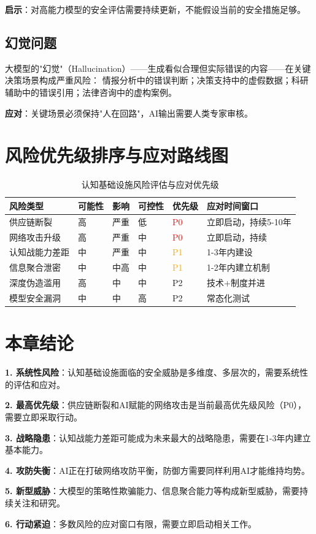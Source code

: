 \textbf{启示}：对高能力模型的安全评估需要持续更新，不能假设当前的安全措施足够。

\subsection{幻觉问题}

大模型的"幻觉"（Hallucination）——生成看似合理但实际错误的内容——在关键决策场景构成严重风险：
情报分析中的错误判断；决策支持中的虚假数据；科研辅助中的错误引用；法律咨询中的虚构案例。

\textbf{应对}：关键场景必须保持"人在回路"，AI输出需要人类专家审核。

\section{风险优先级排序与应对路线图}

\begin{table}[H]
\centering
\caption{认知基础设施风险评估与应对优先级}
\small
\begin{tabular}{p{2.5cm}p{1.2cm}p{1.2cm}p{1.2cm}p{1.5cm}p{3.5cm}}
\toprule
\textbf{风险类型} & \textbf{可能性} & \textbf{影响} & \textbf{可控性} & \textbf{优先级} & \textbf{应对时间窗口} \\
\midrule
供应链断裂 & 高 & 严重 & 低 & \textcolor{red}{P0} & 立即启动，持续5-10年 \\
网络攻击升级 & 高 & 严重 & 中 & \textcolor{red}{P0} & 立即启动，持续 \\
认知战能力差距 & 中 & 严重 & 中 & \textcolor{orange}{P1} & 1-3年内建设 \\
信息聚合泄密 & 中 & 中高 & 中 & \textcolor{orange}{P1} & 1-2年内建立机制 \\
深度伪造滥用 & 高 & 中 & 中 & P2 & 技术+制度并进 \\
模型安全漏洞 & 中 & 中 & 高 & P2 & 常态化测试 \\
\bottomrule
\end{tabular}
\end{table}

\section{本章结论}

\textbf{1. 系统性风险}：认知基础设施面临的安全威胁是多维度、多层次的，需要系统性的评估和应对。

\textbf{2. 最高优先级}：供应链断裂和AI赋能的网络攻击是当前最高优先级风险（P0），需要立即采取行动。

\textbf{3. 战略隐患}：认知战能力差距可能成为未来最大的战略隐患，需要在1-3年内建立基本能力。

\textbf{4. 攻防失衡}：AI正在打破网络攻防平衡，防御方需要同样利用AI才能维持均势。

\textbf{5. 新型威胁}：大模型的策略性欺骗能力、信息聚合能力等构成新型威胁，需要持续关注和研究。

\textbf{6. 行动紧迫}：多数风险的应对窗口有限，需要立即启动相关工作。

